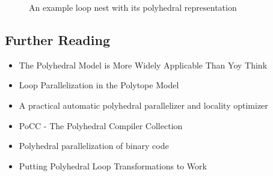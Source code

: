\lstset{frame=none}
\begin{figure}[htbp]
  \centering
  
  \caption{An example loop nest with its polyhedral representation}
  \label{fig:ExampleLoopNest}
\end{figure}
\resetlst



\lstset{frame=none}
\begin{figure}[htbp]
  \centering
\end{figure}
\resetlst

\subsection*{Further Reading}
\begin{itemize}
  \item The Polyhedral Model is More Widely Applicable Than Yoy Think \cite{BPCB10}
  \item Loop Parallelization in the Polytope Model \cite{Lengauer93loopparallelization}  
  \item A practical automatic polyhedral parallelizer and locality optimizer \cite{Bondhugula:2008:PAP:1379022.1375595}
  \item PoCC - The Polyhedral Compiler Collection \cite{PoCC:Online}
  \item Polyhedral parallelization of binary code \cite{Pradelle:2012:PPB:2086696.2086718}
  \item Putting Polyhedral Loop Transformations to Work \cite{BCGST03} 
\end{itemize}

